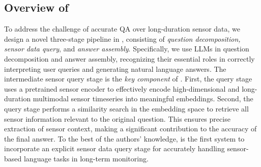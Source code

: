 \subsection{Overview of \Method} 

%
To address the challenge of accurate QA over long-duration sensor data, we design a novel three-stage pipeline in \Method, consisting of \textit{question decomposition, sensor data query}, and \textit{answer assembly}.
Specifically, we use LLMs in question decomposition and answer assembly, recognizing their essential roles in correctly interpreting user queries and generating natural language answers.
The intermediate sensor query stage is the \textit{key component} of \Method.
First, the query stage uses a pretrained sensor encoder to effectively encode high-dimensional and long-duration multimodal sensor timeseries into meaningful embeddings. Second, the query stage performs a similarity search in the embedding space to retrieve all sensor information relevant to the original question. This ensures precise extraction of sensor context, making a significant contribution to the accuracy of the final answer.
To the best of the authors' knowledge, \Method is the first system to incorporate an explicit sensor data query stage for accurately handling sensor-based language tasks in long-term monitoring.

